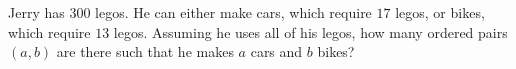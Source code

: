 Jerry has $300$ legos. He can either make cars, which require $17$ legos, or bikes, which require $13$ legos. Assuming he uses all of his legos, how many ordered pairs $(a, b)$ are there such that he makes $a$ cars and $b$ bikes?
